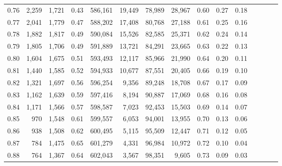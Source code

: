 \begin{tabular}{rrrcrrrrrrrrrrr}
0.76 &   2,259 &  1,721 &                                       0.43 &  586,161 &   19,449 &   78,989 &   28,967 &  0.60 &  0.27 &                         0.18 \\
0.77 &   2,041 &  1,779 &                                       0.47 &  588,202 &   17,408 &   80,768 &   27,188 &  0.61 &  0.25 &                         0.16 \\
0.78 &   1,882 &  1,817 &                                       0.49 &  590,084 &   15,526 &   82,585 &   25,371 &  0.62 &  0.24 &                         0.14 \\
0.79 &   1,805 &  1,706 &                                       0.49 &  591,889 &   13,721 &   84,291 &   23,665 &  0.63 &  0.22 &                         0.13 \\
0.80 &   1,604 &  1,675 &                                       0.51 &  593,493 &   12,117 &   85,966 &   21,990 &  0.64 &  0.20 &                         0.11 \\
0.81 &   1,440 &  1,585 &                                       0.52 &  594,933 &   10,677 &   87,551 &   20,405 &  0.66 &  0.19 &                         0.10 \\
0.82 &   1,321 &  1,697 &                                       0.56 &  596,254 &    9,356 &   89,248 &   18,708 &  0.67 &  0.17 &                         0.09 \\
0.83 &   1,162 &  1,639 &                                       0.59 &  597,416 &    8,194 &   90,887 &   17,069 &  0.68 &  0.16 &                         0.08 \\
0.84 &   1,171 &  1,566 &                                       0.57 &  598,587 &    7,023 &   92,453 &   15,503 &  0.69 &  0.14 &                         0.07 \\
0.85 &     970 &  1,548 &                                       0.61 &  599,557 &    6,053 &   94,001 &   13,955 &  0.70 &  0.13 &                         0.06 \\
0.86 &     938 &  1,508 &                                       0.62 &  600,495 &    5,115 &   95,509 &   12,447 &  0.71 &  0.12 &                         0.05 \\
0.87 &     784 &  1,475 &                                       0.65 &  601,279 &    4,331 &   96,984 &   10,972 &  0.72 &  0.10 &                         0.04 \\
0.88 &     764 &  1,367 &                                       0.64 &  602,043 &    3,567 &   98,351 &    9,605 &  0.73 &  0.09 &                         0.03 \\

\end{tabular}
